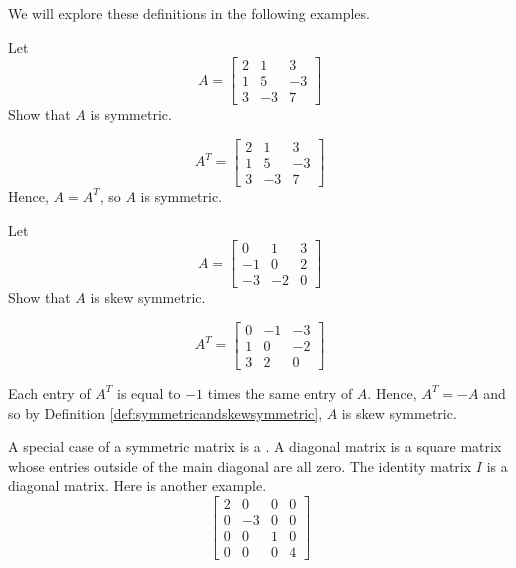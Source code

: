 \documentclass{ximera}
\begin{document}
We will explore these definitions in the following examples.

\begin{example}\label{ex:symmetricmatrix}
Let
\begin{equation*}
A=
\begin{bmatrix}
2 & 1 & 3 \\
1 & 5 & -3 \\
3 & -3 & 7
\end{bmatrix}
\end{equation*}
Show that $A$ is symmetric. 
\begin{explanation}
\begin{equation*}
A^{T} =
\begin{bmatrix}
2 & 1 & 3 \\
1 & 5 & -3 \\
3 & -3 & 7
\end{bmatrix}
\end{equation*}
Hence, $A = A^{T}$, so $A$ is symmetric.
\end{explanation}
\end{example}

\begin{example}\label{ex:skewsymmetricmatrix}
Let
\begin{equation*}
A=
\begin{bmatrix}
0 & 1 & 3 \\
-1 & 0 & 2 \\
-3 & -2 & 0
\end{bmatrix}
\end{equation*}
Show that $A$ is skew symmetric.
\begin{explanation} 
\begin{equation*}
A^{T} = 
\begin{bmatrix}
0 & -1 & -3\\
1 &  0 & -2\\
3 &  2 &  0
\end{bmatrix}
\end{equation*}

Each entry of $A^T$ is equal to $-1$ times the same entry of $A$. 
Hence, $A^{T} = - A$ and so by Definition \ref{def:symmetricandskewsymmetric}, $A$ is skew symmetric. 
\end{explanation}
\end{example}

A special case of a symmetric matrix is a .  A diagonal matrix is a square matrix whose entries outside of the main diagonal are all zero.  The identity matrix $I$ is a diagonal matrix.  Here is another example.
$$\begin{bmatrix}2&0&0&0\\0&-3&0&0\\0&0&1&0\\0&0&0&4\end{bmatrix}$$
\end{document}
